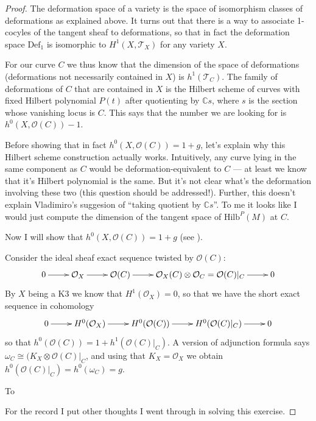 \begin{proof}
The deformation space of a variety is the
space of isomorphism classes of
deformations as explained above. It turns out
that there is a way to associate
1-cocyles of the tangent sheaf to
deformations, so that in fact the deformation
space $\text{Def}_1$ is isomorphic to
$H^{1}(X,\mathcal{T}_X)$ for any variety
$X$.

For our curve $C$ we thus know that the
dimension of the space of deformations
(deformations not necessarily contained in
$X$) is $h^1(\mathcal{T}_C)$.  The
family of deformations of $C$ that are
contained in $X$ is the Hilbert scheme of
curves with fixed Hilbert polynomial $P(t)$
after quotienting by $\mathbb{C}s$,
where $s$ is the section whose vanishing
locus is  $C$.
This says that the number we are looking for
is $h^{0}(X,\mathcal{O}(C))-1$.

Before showing that in fact
$h^0(X,\mathcal{O}(C))=1+g$,
let's explain why this Hilbert scheme
construction actually works.
Intuitively, any curve lying in the same
component
as $C$ would be deformation-equivalent to $C$
--- at least we know that it's Hilbert
polynomial is the same.
But it's not clear what's the deformation
involving these two
(this question should be addressed!).
Further, this doesn't explain Vladimiro's
suggesion of ``taking quotient by
$\mathbb{C}s$''.
To me it looks like I would just compute the
dimension
of the tangent space of $\text{Hilb}^P(M)$ at
$C$.

Now I will show that
$h^0(X,\mathcal{O}(C))=1+g$ (see
\cite[Lemma 1.2.1, Remark 1.2.2]{huk}).

Consider the ideal sheaf exact sequence
twisted by
$\mathcal{O}(C)$:
$$
\xymatrix{
0\ar[r]&\mathcal{O}_X\ar[r]&\mathcal{O}(C)
\ar[r]
&\mathcal{O}_X(C) \otimes
\mathcal{O}_C=\mathcal{O}(C)|_{C}\ar[r]&0
}
$$
By $X$ being a K3 we know that
$H^{1}(\mathcal{O}_X)=0$, so that we have the
short exact sequence in cohomology
$$
\xymatrix{
0\ar[r]&H^{0}(\mathcal{O}_X)\ar[r]&H^{0}
(\mathcal{O}(C))\ar[r]
&H^{0}(\mathcal{O}(C)|_{C})\ar[r]&0
}
$$
so that
$h^0(\mathcal{O}(C))=1+h^1(\mathcal{O}(C)
|_{C})$.
A version of adjunction formula says
$\omega_C \cong (K_X
\otimes\mathcal{O}(C)|_{C}$, and using that
$K_X=\mathcal{O}_X$ we obtain
$h^0(\mathcal{O}(C)|_{C})=h^0(\omega_C)=g$.

To

\medskip\noindent
For the record I put other thoughts I went
through in solving this exercise.


\end{proof}
